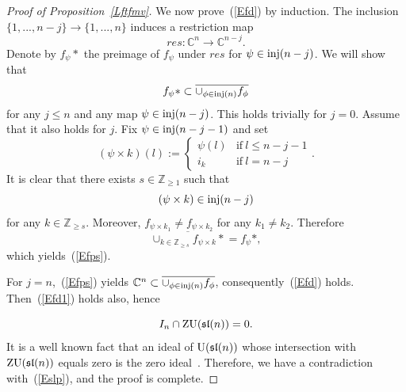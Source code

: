 \documentclass[10pt]{amsart}\oddsidemargin -1mm \evensidemargin -1mm \topmargin -15mm\headheight5mm \headsep 3.5mm \textheight 245mm\textwidth 170mm %
\theoremstyle{definition}\newtheorem{theorem}{Theorem}[section]\newtheorem{lemma}[theorem]{Lemma}\newtheorem{remark}[theorem]{Remark}\newtheorem{proposition}[theorem]{Proposition}\newtheorem{corollary}[theorem]{Corollary}\newtheorem{definition}[theorem]{Definition}\newtheorem{Ex}[theorem]{Example}
\newcounter{AP}
\begin{document}
\begin{proof}[Proof of Proposition~\ref{Lftfmv}]
We now prove~(\ref{Efd}) by
induction. The inclusion $\{1,..., n-j\}\to\{1,..., n\}$ induces a restriction map $$res: \mathbb C^n\to \mathbb C^{n-j}.$$ Denote by $f_\psi*$ the preimage of $f_\psi$ under
$res$ for $\psi\in\operatorname{\mathrm{inj}}(n-j)$. %
We will show that %
\begin{equation}f_\psi*\subset\overline{\cup_{\phi\in
\operatorname{\mathrm{inj}}(n)}f_\phi}\label{Efps}\end{equation}for any  $j\le n$ and any map $\psi\in\operatorname{\mathrm{inj}}(n-j)$. This holds trivially for $j=0$. Assume that it also holds for $j$.
Fix $\psi\in \operatorname{\mathrm{inj}}(n-j-1)$ and set
$$(\psi\times k)(l):=\begin{cases}\psi(l)&\mbox{if}~l\le n-j-1\\i_k&\mbox{if}~l=n-j\end{cases}.$$
It is clear that there exists $s\in\mathbb Z_{\ge1}$ such that
$$(\psi\times k)\in\operatorname{\mathrm{inj}}(n-j)$$ for any $k\in\mathbb Z_{\ge s}$.
Moreover, $f_{\psi\times k_1}\ne f_{\psi\times k_2}$ for any $k_1\ne k_2$.
Therefore$$\overline{\cup_{k\in\mathbb Z_{\ge s}}f_{\psi\times
k}*}=f_\psi*,$$which yields~(\ref{Efps}).


For $j=n$,~(\ref{Efps}) yields $\mathbb C^n\subset \overline{\cup_{\phi\in
\operatorname{\mathrm{inj}}(n)}f_\phi}$, consequently~(\ref{Efd}) holds. Then~(\ref{Efd1}) holds also, hence


$$I_n\cap\operatorname{\mathrm{ZU}}(\frak{sl}(n))=0.$$%
It is a well known fact that an ideal of $\operatorname{\mathrm{U}}(\frak{sl}(n))$ whose intersection with $\operatorname{\mathrm{ZU}}(\frak{sl}(n))$ equals zero is the zero ideal~\cite[Proposition 4.2.2]{Dix}. Therefore, we have a contradiction with~(\ref{Eslp}), and the proof is complete.
\end{proof}
\end{document}
